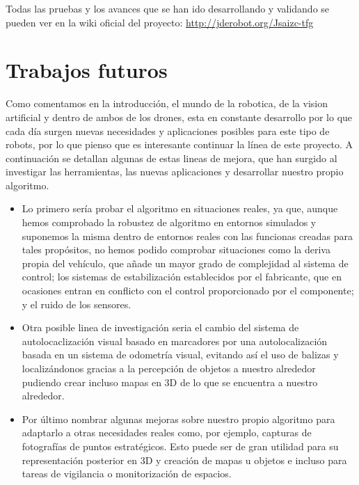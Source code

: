 \hspace{1cm} Todas las pruebas y los avances que se han ido desarrollando y validando se pueden ver en la wiki oficial del proyecto: \url{http://jderobot.org/Jsaizc-tfg}

\section{Trabajos futuros}
\hspace{1cm} Como comentamos en la introducción, el mundo de la robotica, de la vision artificial y dentro de ambos de los drones, esta en constante desarrollo por lo que cada día surgen nuevas necesidades y aplicaciones posibles para este tipo de robots, por lo que pienso que es interesante continuar la línea de este proyecto. A continuación se detallan algunas de estas lineas de mejora, que han surgido al investigar las herramientas, las nuevas aplicaciones y desarrollar nuestro propio algoritmo.

\begin{itemize}
	\item Lo primero sería probar el algoritmo en situaciones reales, ya que, aunque hemos comprobado la robustez de algoritmo en entornos simulados y suponemos la misma dentro de entornos reales con las funcionas creadas para tales propósitos, no hemos podido comprobar situaciones como la deriva propia del vehículo, que añade un mayor grado de complejidad al sistema de control; los sistemas de estabilización establecidos por el fabricante, que en ocasiones entran en conflicto con el control proporcionado por el componente; y el ruido de los sensores.
	\item Otra posible linea de investigación seria el cambio del sistema de autolocaclización visual basado en marcadores por una autolocalización basada en un sistema de odometría visual, evitando así el uso de balizas y localizándonos gracias a la percepción de objetos a nuestro alrededor pudiendo crear incluso mapas en 3D de lo que se encuentra a nuestro alrededor.
	\item Por último nombrar algunas mejoras sobre nuestro propio algoritmo para adaptarlo a otras necesidades reales como, por ejemplo, capturas de fotografías de puntos estratégicos. Esto puede ser de gran utilidad para su representación posterior en 3D y creación de mapas u objetos e incluso para tareas de vigilancia o monitorización de espacios.
\end{itemize}